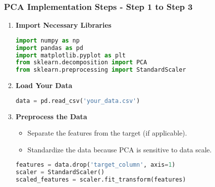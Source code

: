 \documentclass[aspectratio=169]{beamer}
\begin{document}
\begin{frame}[fragile]
    \frametitle{PCA Implementation Steps - Step 1 to Step 3}
    \begin{enumerate}
        \item \textbf{Import Necessary Libraries}
        \begin{lstlisting}[language=Python]
import numpy as np
import pandas as pd
import matplotlib.pyplot as plt
from sklearn.decomposition import PCA
from sklearn.preprocessing import StandardScaler
        \end{lstlisting}
        
        \item \textbf{Load Your Data}
        \begin{lstlisting}[language=Python]
data = pd.read_csv('your_data.csv')
        \end{lstlisting}

        \item \textbf{Preprocess the Data}
        \begin{itemize}
            \item Separate the features from the target (if applicable).
            \item Standardize the data because PCA is sensitive to data scale.
        \end{itemize}
        \begin{lstlisting}[language=Python]
features = data.drop('target_column', axis=1)
scaler = StandardScaler()
scaled_features = scaler.fit_transform(features)
        \end{lstlisting}
    \end{enumerate}
\end{frame}
\end{document}
